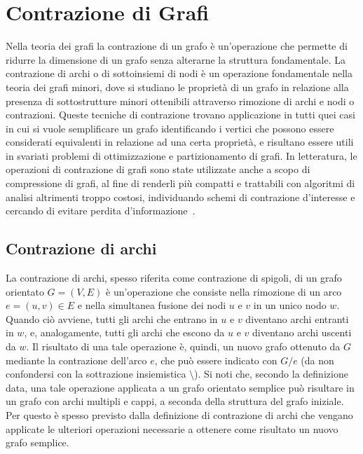\section{Contrazione di Grafi}\label{sec:contrazione-di-grafi}

Nella teoria dei grafi la contrazione di un grafo \`e un'operazione che permette di ridurre la dimensione di un grafo
senza alterarne la struttura fondamentale. \newline
La contrazione di archi o di sottoinsiemi di nodi \`e un operazione fondamentale nella teoria dei grafi minori, dove
si studiano le propriet\`a di un grafo in relazione alla presenza di sottostrutture minori ottenibili attraverso
rimozione di archi e nodi o contrazioni. \newline
Queste tecniche di contrazione trovano applicazione in tutti quei casi in cui si vuole semplificare un grafo
identificando i vertici che possono essere considerati equivalenti in relazione ad una certa propriet\`a,
e risultano essere utili in svariati problemi di ottimizzazione e partizionamento di grafi.
In letteratura, le operazioni di contrazione di grafi sono state utilizzate anche a scopo di compressione di grafi,
al fine di renderli pi\`u compatti e trattabili con algoritmi di analisi altrimenti troppo costosi,
individuando schemi di contrazione d'interesse e cercando di evitare perdita d'informazione~\cite{10.1145/3448016.3452797}. \newline


\subsection{Contrazione di archi}\label{subsec:contrazione-di-archi}

La contrazione di archi, spesso riferita come contrazione di spigoli, di un grafo orientato $G = (V, E)$ \`e
un'operazione che consiste nella rimozione di un arco $e = (u, v) \in E$ e nella simultanea fusione dei nodi $u$ e
$v$ in un unico nodo $w$.
Quando ci\`o avviene, tutti gli archi che entrano in $u$ e $v$ diventano archi entranti in $w$, e, analogamente,
tutti gli archi che escono da $u$ e $v$ diventano archi uscenti da $w$.
Il risultato di una tale operazione \`e, quindi, un nuovo grafo ottenuto da $G$ mediante la contrazione
dell'arco $e$, che pu\`o essere indicato con $G/e$ (da non confondersi con la sottrazione insiemistica $\setminus$).
Si noti che, secondo la definizione data, una tale operazione applicata a un grafo orientato semplice pu\`o risultare
in un grafo con archi multipli e cappi, a seconda della struttura del grafo iniziale.
Per questo \`e spesso previsto dalla definizione di contrazione di archi che vengano applicate le ulteriori operazioni
necessarie a ottenere come risultato un nuovo grafo semplice.

